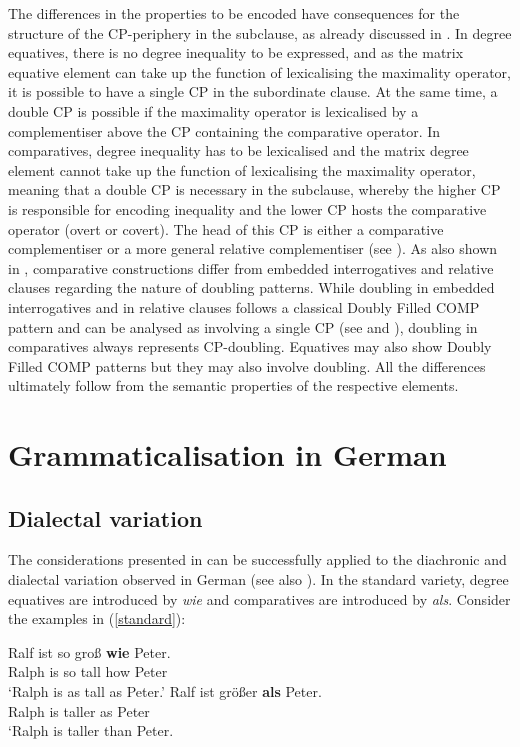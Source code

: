 The differences in the properties to be encoded have consequences for the structure of the CP-periphery in the subclause, as already discussed in . In degree equatives, there is no degree inequality to be expressed, and as the matrix equative element can take up the function of lexicalising the maximality operator, it is possible to have a single CP in the subordinate clause. At the same time, a double CP is possible if the maximality operator is lexicalised by a complementiser above the CP containing the comparative operator. In comparatives, degree inequality has to be lexicalised and the matrix degree element cannot take up the function of lexicalising the maximality operator, meaning that a double CP is necessary in the subclause, whereby the higher CP is responsible for encoding inequality and the lower CP hosts the comparative operator (overt or covert). The head of this CP is either a comparative complementiser or a more general relative complementiser (see \citealt{bacskaiatkari2016alh}). As also shown in , comparative constructions differ from embedded interrogatives and relative clauses regarding the nature of doubling patterns. While doubling in embedded interrogatives and in relative clauses follows a classical Doubly Filled COMP pattern and can be analysed as involving a single CP (see  and ), doubling in comparatives always represents CP-doubling. Equatives may also show Doubly Filled COMP patterns but they may also involve doubling. All the differences ultimately follow from the semantic properties of the respective elements.

\section{Grammaticalisation in German} \label{sec:5grammaticalisation}
\subsection{Dialectal variation} \label{sec:5dialectal}
The considerations presented in  can be successfully applied to the diachronic and dialectal variation observed in German (see also \citealt{bacskaiatkari2021oup}). In the standard variety, degree equatives are introduced by \textit{wie} and comparatives are introduced by \textit{als}. Consider the examples in (\ref{standard}):

\ea \label{standard}
\ea \gll Ralf ist so groß \textbf{wie} Peter.\\
Ralph is so tall how Peter\\
\glt `Ralph is as tall as Peter.'
\ex \gll Ralf ist größer \textbf{als} Peter.\\
Ralph is taller as Peter\\
\glt `Ralph is taller than Peter.
\z
\z

